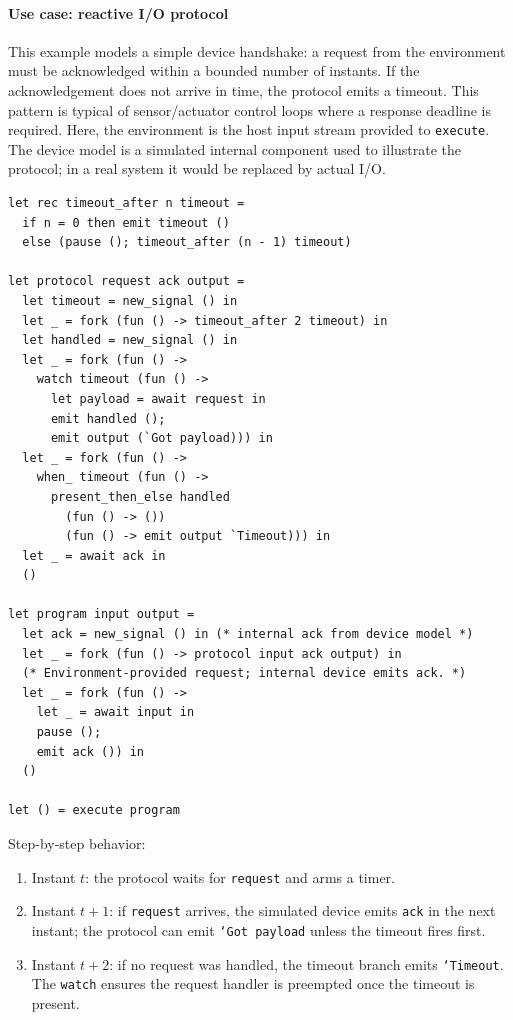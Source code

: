 \paragraph{Use case: reactive I/O protocol}
This example models a simple device handshake: a request from the environment
must be acknowledged within a bounded number of instants. If the acknowledgement
does not arrive in time, the protocol emits a timeout. This pattern is typical
of sensor/actuator control loops where a response deadline is required.
Here, the environment is the host input stream provided to \texttt{execute}.
The device model is a simulated internal component used to illustrate the
protocol; in a real system it would be replaced by actual I/O.
\begin{lstlisting}[style=tempo]
let rec timeout_after n timeout =
  if n = 0 then emit timeout ()
  else (pause (); timeout_after (n - 1) timeout)

let protocol request ack output =
  let timeout = new_signal () in
  let _ = fork (fun () -> timeout_after 2 timeout) in
  let handled = new_signal () in
  let _ = fork (fun () ->
    watch timeout (fun () ->
      let payload = await request in
      emit handled ();
      emit output (`Got payload))) in
  let _ = fork (fun () ->
    when_ timeout (fun () ->
      present_then_else handled
        (fun () -> ())
        (fun () -> emit output `Timeout))) in
  let _ = await ack in
  ()

let program input output =
  let ack = new_signal () in (* internal ack from device model *)
  let _ = fork (fun () -> protocol input ack output) in
  (* Environment-provided request; internal device emits ack. *)
  let _ = fork (fun () ->
    let _ = await input in
    pause ();
    emit ack ()) in
  ()

let () = execute program
\end{lstlisting}
Step-by-step behavior:
\begin{enumerate}
\item Instant $t$: the protocol waits for \texttt{request} and arms a timer.
\item Instant $t{+}1$: if \texttt{request} arrives, the simulated device emits
  \texttt{ack} in the next instant; the protocol can emit \texttt{`Got payload}
  unless the timeout fires first.
\item Instant $t{+}2$: if no request was handled, the timeout branch emits
  \texttt{`Timeout}. The \texttt{watch} ensures the request handler is
  preempted once the timeout is present.
\end{enumerate}

